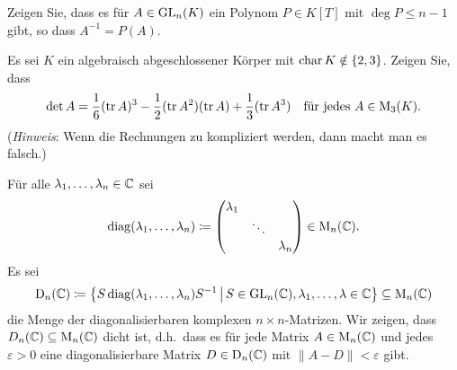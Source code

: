 \documentclass[a4paper,10pt]{scrartcl}
\begin{document}
\begin{question}
  Zeigen Sie, dass es für $A \in \operatorname{GL}_n(K)$ ein Polynom $P \in K[T]$ mit $\deg P \leq n-1$ gibt, so dass $A^{-1} = P(A)$.
\end{question}


\begin{question}
  Es sei $K$ ein algebraisch abgeschlossener Körper mit $\operatorname{char} K \notin \{2,3\}$.
  Zeigen Sie, dass
  \[
    \det A = \frac{1}{6} (\operatorname{tr} A)^3 - \frac{1}{2} (\operatorname{tr} A^2)(\operatorname{tr} A) + \frac{1}{3} (\operatorname{tr} A^3)
    \quad
    \text{für jedes $A \in \operatorname{M}_3(K)$}.
  \]
  (\emph{Hinweis}: Wenn die Rechnungen zu kompliziert werden, dann macht man es falsch.)
\end{question}



\begin{question}
  Für alle $\lambda_1, \dotsc, \lambda_n \in \mathbb{C}$ sei
  \[
    \operatorname{\operatorname{diag}}(\lambda_1, \dotsc, \lambda_n)
    \coloneqq
    \begin{pmatrix}
      \lambda_1 &         &           \\
                & \ddots  &           \\
                &         & \lambda_n
    \end{pmatrix}
    \in \operatorname{M}_n(\mathbb{C}).
  \]
  Es sei
  \[
    \operatorname{D}_n(\mathbb{C})
    \coloneqq
    \left\{
      S \operatorname{\operatorname{diag}}(\lambda_1, \dotsc, \lambda_n) S^{-1}
    \,\middle|\,
      S \in \operatorname{GL}_n(\mathbb{C}),
      \lambda_1, \dotsc, \lambda \in \mathbb{C}
    \right\}
    \subseteq \operatorname{M}_n(\mathbb{C})
  \]
  die Menge der diagonalisierbaren komplexen $n \times n$-Matrizen.
  Wir zeigen, dass $D_n(\mathbb{C}) \subseteq \operatorname{M}_n(\mathbb{C})$ dicht ist, d.h.\ dass es für jede Matrix $A \in \operatorname{M}_n(\mathbb{C})$ und jedes $\varepsilon > 0$ eine diagonalisierbare Matrix $D \in \operatorname{D}_n(\mathbb{C})$ mit $\|A-D\| < \varepsilon$ gibt.
  

\end{question}
\end{document}
